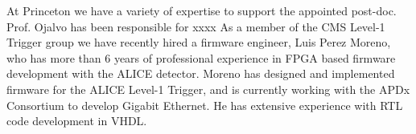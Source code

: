 \documentclass[preprint,12pt]{elsarticle}
\begin{document}


At Princeton we have a variety of expertise to support the appointed post-doc.
Prof. Ojalvo has been responsible for xxxx
As a member of the CMS Level-1 Trigger group we have recently hired a firmware
engineer, Luis Perez Moreno, who has more than 6 years of professional experience in
FPGA based firmware development with the ALICE detector. 
Moreno has designed and implemented firmware for the ALICE
Level-1 Trigger, and is currently working with the APDx Consortium to develop Gigabit Ethernet. He has extensive experience with RTL code development in VHDL. 

\newpage
\end{document}
